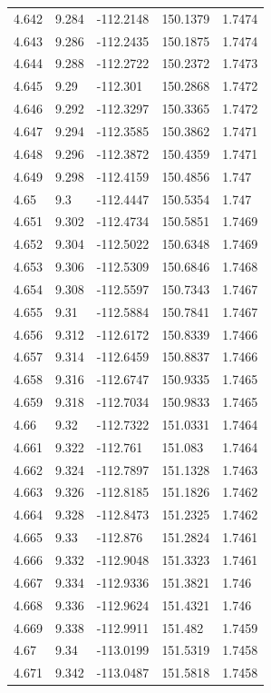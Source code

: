 \begin{tabular}{lllll}
4.642 & 9.284 & -112.2148 & 150.1379 & 1.7474 \\
4.643 & 9.286 & -112.2435 & 150.1875 & 1.7474 \\
4.644 & 9.288 & -112.2722 & 150.2372 & 1.7473 \\
4.645 & 9.29 & -112.301 & 150.2868 & 1.7472 \\
4.646 & 9.292 & -112.3297 & 150.3365 & 1.7472 \\
4.647 & 9.294 & -112.3585 & 150.3862 & 1.7471 \\
4.648 & 9.296 & -112.3872 & 150.4359 & 1.7471 \\
4.649 & 9.298 & -112.4159 & 150.4856 & 1.747 \\
4.65 & 9.3 & -112.4447 & 150.5354 & 1.747 \\
4.651 & 9.302 & -112.4734 & 150.5851 & 1.7469 \\
4.652 & 9.304 & -112.5022 & 150.6348 & 1.7469 \\
4.653 & 9.306 & -112.5309 & 150.6846 & 1.7468 \\
4.654 & 9.308 & -112.5597 & 150.7343 & 1.7467 \\
4.655 & 9.31 & -112.5884 & 150.7841 & 1.7467 \\
4.656 & 9.312 & -112.6172 & 150.8339 & 1.7466 \\
4.657 & 9.314 & -112.6459 & 150.8837 & 1.7466 \\
4.658 & 9.316 & -112.6747 & 150.9335 & 1.7465 \\
4.659 & 9.318 & -112.7034 & 150.9833 & 1.7465 \\
4.66 & 9.32 & -112.7322 & 151.0331 & 1.7464 \\
4.661 & 9.322 & -112.761 & 151.083 & 1.7464 \\
4.662 & 9.324 & -112.7897 & 151.1328 & 1.7463 \\
4.663 & 9.326 & -112.8185 & 151.1826 & 1.7462 \\
4.664 & 9.328 & -112.8473 & 151.2325 & 1.7462 \\
4.665 & 9.33 & -112.876 & 151.2824 & 1.7461 \\
4.666 & 9.332 & -112.9048 & 151.3323 & 1.7461 \\
4.667 & 9.334 & -112.9336 & 151.3821 & 1.746 \\
4.668 & 9.336 & -112.9624 & 151.4321 & 1.746 \\
4.669 & 9.338 & -112.9911 & 151.482 & 1.7459 \\
4.67 & 9.34 & -113.0199 & 151.5319 & 1.7458 \\
4.671 & 9.342 & -113.0487 & 151.5818 & 1.7458 \\

\end{tabular}
